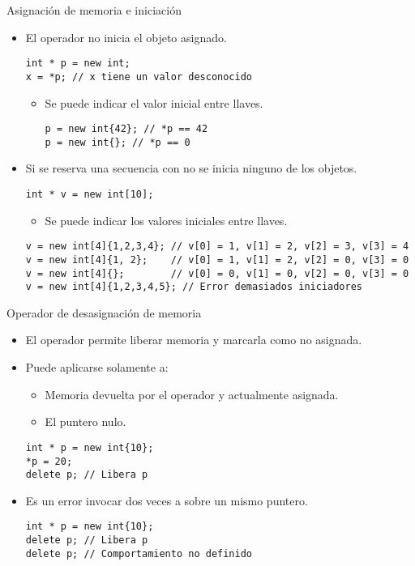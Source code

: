 \begin{frame}[t,fragile]{Asignación de memoria e iniciación}
\begin{itemize}
  \item El operador  no inicia el objeto asignado.
\begin{lstlisting}
int * p = new int;
x = *p; // x tiene un valor desconocido
\end{lstlisting}
    \begin{itemize}
      \item Se puede indicar el valor inicial entre llaves.
\begin{lstlisting}
p = new int{42}; // *p == 42
p = new int{}; // *p == 0
\end{lstlisting}
    \end{itemize}

  \vfill\pause
  \item Si se reserva una secuencia con  no se inicia ninguno de los objetos.
\begin{lstlisting}
int * v = new int[10];
\end{lstlisting}
    \begin{itemize}
      \item Se puede indicar los valores iniciales entre llaves.
    \end{itemize}
\begin{lstlisting}
v = new int[4]{1,2,3,4}; // v[0] = 1, v[1] = 2, v[2] = 3, v[3] = 4
v = new int[4]{1, 2};    // v[0] = 1, v[1] = 2, v[2] = 0, v[3] = 0
v = new int[4]{};        // v[0] = 0, v[1] = 0, v[2] = 0, v[3] = 0
v = new int[4]{1,2,3,4,5}; // Error demasiados iniciadores
\end{lstlisting}
\end{itemize}
\end{frame}

\begin{frame}[fragile]{Operador de desasignación de memoria}
\begin{itemize}
  \item El operador  permite liberar memoria y marcarla como no asignada.
  \item Puede aplicarse solamente a:
    \begin{itemize}
      \item Memoria devuelta por el operador  y actualmente asignada.
      \item El puntero nulo.
    \end{itemize}
\begin{lstlisting}
int * p = new int{10};
*p = 20;
delete p; // Libera p
\end{lstlisting}
  \item Es un error invocar dos veces a  sobre un mismo puntero.
\begin{lstlisting}
int * p = new int{10};
delete p; // Libera p
delete p; // Comportamiento no definido
\end{lstlisting}
\end{itemize}
\end{frame}

